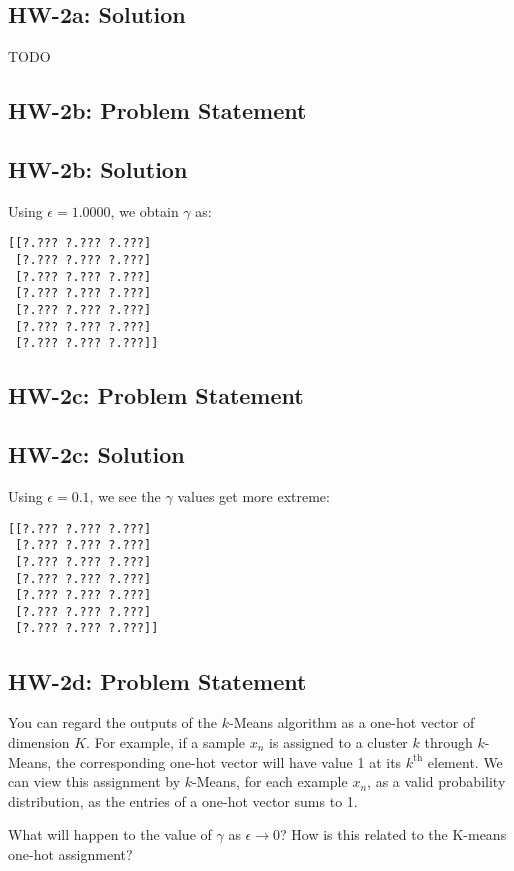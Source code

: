 \documentclass[10pt]{article}
\newcommand{\officialdirections}[1]{{\color{blue} #1}}
\begin{document}
\subsection{HW-2a: Solution}

TODO



\newpage
\officialdirections{
\subsection*{HW-2b: Problem Statement}
}

\subsection{HW-2b: Solution}

Using $\epsilon = 1.0000$, we obtain $\gamma$ as:
\begin{verbatim}
[[?.??? ?.??? ?.???]
 [?.??? ?.??? ?.???]
 [?.??? ?.??? ?.???]
 [?.??? ?.??? ?.???]
 [?.??? ?.??? ?.???]
 [?.??? ?.??? ?.???]
 [?.??? ?.??? ?.???]]
\end{verbatim}

\officialdirections{
\subsection*{HW-2c: Problem Statement}
}

\subsection{HW-2c: Solution}

Using $\epsilon = 0.1$, we see the $\gamma$ values get more extreme:
\begin{verbatim}
[[?.??? ?.??? ?.???]
 [?.??? ?.??? ?.???]
 [?.??? ?.??? ?.???]
 [?.??? ?.??? ?.???]
 [?.??? ?.??? ?.???]
 [?.??? ?.??? ?.???]
 [?.??? ?.??? ?.???]]
\end{verbatim}

\newpage
\officialdirections{
\subsection*{HW-2d: Problem Statement}
You can regard the outputs of the $k$-Means algorithm as a one-hot vector of dimension $K$. For example, if a sample $x_n$ is assigned to a cluster $k$ through $k$-Means, the corresponding one-hot vector will have value 1 at its $k^\text{th}$ element. We can view this assignment by $k$-Means, for each example $x_n$, as a valid probability distribution, as the entries of a one-hot vector sums to 1.


What will happen to the value of $\gamma$ as $\epsilon \rightarrow 0$? How is this related to the K-means one-hot assignment? 
}
\end{document}
